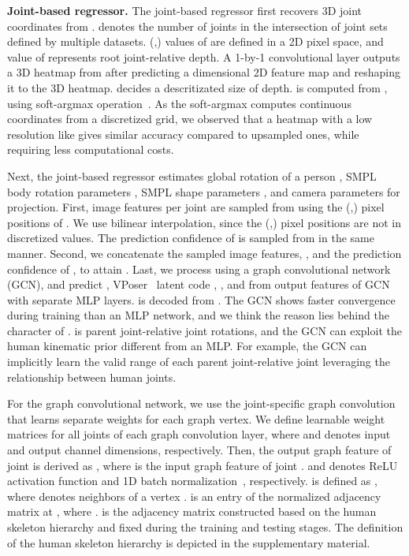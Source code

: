 \documentclass[10pt,twocolumn,letterpaper]{article}
\begin{document}
\noindent\textbf{Joint-based regressor.} 
The joint-based regressor first recovers 3D joint coordinates  from .
 denotes the number of joints in the intersection of joint sets defined by multiple datasets.
(,) values of  are defined in a 2D pixel space, and  value of  represents root joint-relative depth.
A 1-by-1 convolutional layer outputs a 3D heatmap  from  after predicting a  dimensional 2D feature map and reshaping it to the 3D heatmap.
 decides a descritizated size of depth.
 is computed from , using soft-argmax operation~\cite{sun2017compositional}.
As the soft-argmax computes continuous coordinates from a discretized grid, we observed that a heatmap with a low resolution like  gives similar accuracy compared to upsampled ones, while requiring less computational costs.

Next, the joint-based regressor estimates global rotation of a person , SMPL body rotation parameters , SMPL shape parameters , and camera parameters  for projection.
First, image features per joint are sampled from  using the (,) pixel positions of .
We use bilinear interpolation, since the (,) pixel positions are not in discretized values.
The prediction confidence of  is sampled from  in the same manner. 
Second, we concatenate the sampled image features, , and the prediction confidence of , to attain .
Last, we process  using a graph convolutional network (GCN), and predict , VPoser~\cite{pavlakos2019expressive} latent code , , and  from output features of GCN with separate MLP layers.
 is decoded from .
The GCN shows faster convergence during training than an MLP network, and we think the reason lies behind the character of .
 is parent joint-relative joint rotations, and the GCN can exploit the human kinematic prior different from an MLP.
For example, the GCN can implicitly learn the valid range of each parent joint-relative joint leveraging the relationship between human joints.


For the graph convolutional network, we use the joint-specific graph convolution~\cite{liu2020comprehensive} that learns separate weights for each graph vertex.
We define learnable weight matrices  for all joints of each graph convolution layer, where  and  denotes input and output channel dimensions, respectively.
Then, the output graph feature of joint  is derived as , where  is the input graph feature of joint .
 and  denotes ReLU activation function and 1D batch normalization~\cite{ioffe2015batch}, respectively.
 is defined as , where  denotes neighbors of a vertex .
 is an entry of the normalized adjacency matrix  at , where .
 is the adjacency matrix constructed based on the human skeleton hierarchy and fixed during the training and testing stages.
The definition of the human skeleton hierarchy is depicted in the supplementary material.
\end{document}
